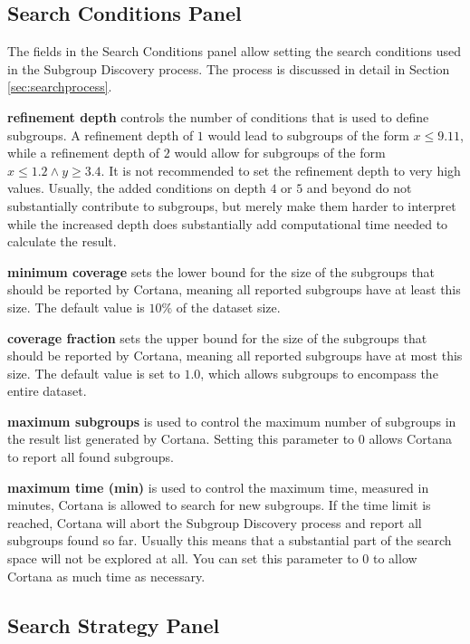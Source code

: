 \documentclass{article}
\begin{document}
\subsection{Search Conditions Panel}
\label{sec:searchconditions}

The fields in the Search Conditions panel allow setting the search
conditions used in the Subgroup Discovery process.  The process is discussed
in detail in Section \ref{sec:searchprocess}.

\textbf{refinement depth} controls the number of conditions that is used to
define subgroups.  A refinement depth of $1$ would lead to subgroups of the
form $x \leq 9.11$, while a refinement depth of $2$ would allow for
subgroups of the form $x \leq 1.2 \wedge y \geq 3.4$.  It is not recommended
to set the refinement depth to very high values.  Usually, the added
conditions on depth $4$ or $5$ and beyond do not substantially contribute to
subgroups, but merely make them harder to interpret while the increased
depth does substantially add computational time needed to calculate the
result.

\textbf{minimum coverage} sets the lower bound for the size of the subgroups
that should be reported by Cortana, meaning all reported subgroups have at
least this size.  The default value is $10\%$ of the dataset size.

\textbf{coverage fraction} sets the upper bound for the size of the
subgroups that should be reported by Cortana, meaning all reported subgroups
have at most this size.  The default value is set to $1.0$, which allows
subgroups to encompass the entire dataset.

\textbf{maximum subgroups} is used to control the maximum number of
subgroups in the result list generated by Cortana.  Setting this parameter
to $0$ allows Cortana to report all found subgroups.

\textbf{maximum time (min)} is used to control the maximum time, measured in
minutes, Cortana is allowed to search for new subgroups.  If the time limit
is reached, Cortana will abort the Subgroup Discovery process and report all
subgroups found so far.  Usually this means that a substantial part of the
search space will not be explored at all.  You can set this parameter to $0$
to allow Cortana as much time as necessary.

\subsection{Search Strategy Panel}
\label{sec:searchstrategy}
\end{document}
